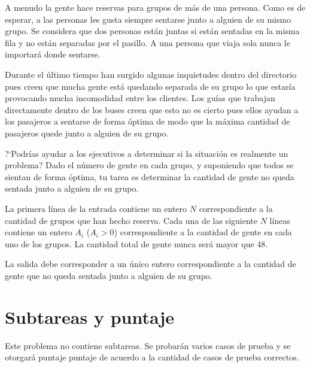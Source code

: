 \documentclass{oci}
\begin{document}
\begin{problemDescription}
\begin{center}
  \end{center}
  \vspace{-9em}
  A menudo la gente hace reservas para grupos de más de una persona.
  Como es de esperar, a las personas les gusta siempre sentarse junto a alguien
  de su mismo grupo.
  Se considera que dos personas están juntas si están sentadas en la misma fila
  y no están separadas por el pasillo.
  A una persona que viaja sola nunca le importará donde sentarse.

  Durante el último tiempo han surgido algunas inquietudes dentro del directorio
  pues creen que mucha gente está quedando separada de su grupo lo que
  estaría provocando mucha incomodidad entre los clientes.
  Los guías que trabajan directamente dentro de los buses creen que esto no es
  cierto pues ellos ayudan a los pasajeros a sentarse de forma óptima de modo
  que la máxima cantidad de pasajeros quede junto a alguien de su grupo.

  ?`Podrías ayudar a los ejecutivos a determinar si la situación es realmente un
  problema?
  Dado el número de gente en cada grupo, y suponiendo que todos se sientan de
  forma óptima, tu tarea es determinar la cantidad de gente no queda sentada
  junto a alguien de su grupo.
  
\end{problemDescription}

\begin{inputDescription}
  La primera línea de la entrada contiene un entero $N$ correspondiente a la
  cantidad de grupos que han hecho reserva.
  Cada una de las siguiente $N$ líneas contiene un entero $A_i$ ($A_i > 0$)
  correspondiente a la cantidad de gente en cada uno de los grupos.
  La cantidad total de gente nunca será mayor que 48.
\end{inputDescription}

\begin{outputDescription}
  La salida debe corresponder a un único entero correspondiente a la cantidad de
  gente que no queda sentada junto a alguien de su grupo.
\end{outputDescription}

\section*{Subtareas y puntaje}
Este problema no contiene subtareas. Se probarán varios casos de prueba y se
otorgará puntaje puntaje de acuerdo a la cantidad de casos de prueba correctos.

\begin{sampleDescription}
\end{sampleDescription}
\end{document}
